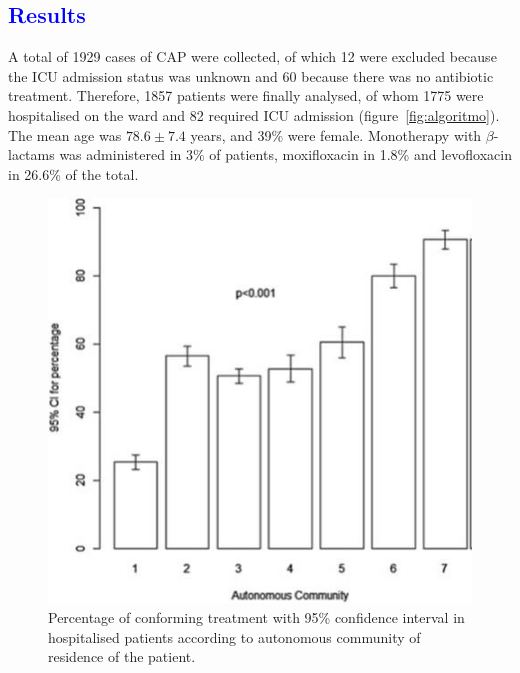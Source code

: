\documentclass[11pt, a4paper]{article}
\begin{document}
\begin{multicols}{2}

\section*{\textcolor{blue}{Results}}
A total of 1929 cases of CAP were collected, of which 12 were excluded because the ICU admission status was unknown and 60 because there was no antibiotic treatment. Therefore, 1857 patients were finally analysed, of whom 1775 were hospitalised on the ward and 82 required ICU admission (figure~\ref{fig:algoritmo}). The mean age was $78.6 \pm 7.4$ years, and 39\% were female. Monotherapy with $\beta$-lactams was administered in 3\% of patients, moxifloxacin in 1.8\% and levofloxacin in 26.6\% of the total.

\begin{figure}[H]
\includegraphics[scale=.60]{adecuacion_ccaa.jpg}
\caption{\footnotesize Percentage of conforming treatment with 95\% confidence interval in hospitalised patients according to autonomous community of residence of the patient.}
\label{fig:ccaa}
\end{figure}


\end{multicols}
\end{document}
